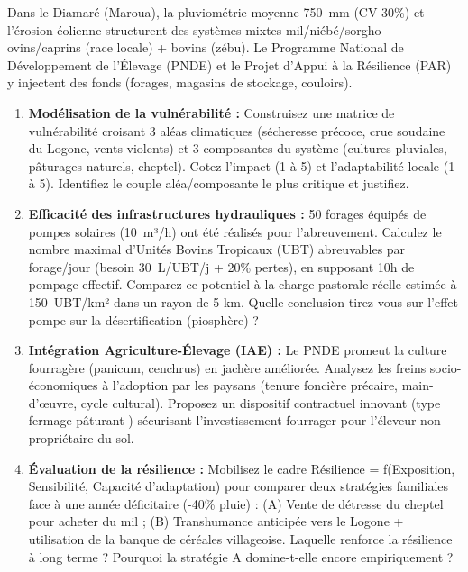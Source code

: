 \documentclass[11pt]{article}
\begin{document}
\begin{exercice}
Dans le Diamaré (Maroua), la pluviométrie moyenne \SI{750}{mm} (CV 30\%) et l'érosion éolienne structurent des systèmes mixtes mil/niébé/sorgho + ovins/caprins (race locale) + bovins (zébu). Le Programme National de Développement de l'Élevage (PNDE) et le Projet d'Appui à la Résilience (PAR) y injectent des fonds (forages, magasins de stockage, couloirs).
\begin{enumerate}
    \item \textbf{Modélisation de la vulnérabilité :} Construisez une matrice de vulnérabilité croisant 3 aléas climatiques (sécheresse précoce, crue soudaine du Logone, vents violents) et 3 composantes du système (cultures pluviales, pâturages naturels, cheptel). Cotez l'impact (1 à 5) et l'adaptabilité locale (1 à 5). Identifiez le couple \og aléa/composante \fg le plus critique et justifiez.
    \item \textbf{Efficacité des infrastructures hydrauliques :} 50 forages équipés de pompes solaires (\SI{10}{m³/h}) ont été réalisés pour l'abreuvement. Calculez le nombre maximal d'Unités Bovins Tropicaux (UBT) abreuvables par forage/jour (besoin \SI{30}{L/UBT/j} + 20\% pertes), en supposant 10h de pompage effectif. Comparez ce potentiel à la charge pastorale réelle estimée à \SI{150}{UBT/km²} dans un rayon de 5 km. Quelle conclusion tirez-vous sur l'effet \og pompe \fg sur la désertification (piosphère) ?
    \item \textbf{Intégration Agriculture-Élevage (IAE) :} Le PNDE promeut la \og culture fourragère \fg (panicum, cenchrus) en jachère améliorée. Analysez les freins socio-économiques à l'adoption par les paysans (tenure foncière précaire, main-d'œuvre, cycle cultural). Proposez un dispositif contractuel innovant (type \og fermage pâturant \fg) sécurisant l'investissement fourrager pour l'éleveur non propriétaire du sol.
    \item \textbf{Évaluation de la résilience :} Mobilisez le cadre \og Résilience = f(Exposition, Sensibilité, Capacité d'adaptation) \fg pour comparer deux stratégies familiales face à une année déficitaire (-40\% pluie) : (A) Vente de détresse du cheptel pour acheter du mil ; (B) Transhumance anticipée vers le Logone + utilisation de la banque de céréales villageoise. Laquelle renforce la résilience à long terme ? Pourquoi la stratégie A domine-t-elle encore empiriquement ?
\end{enumerate}
\end{exercice}
\end{document}
